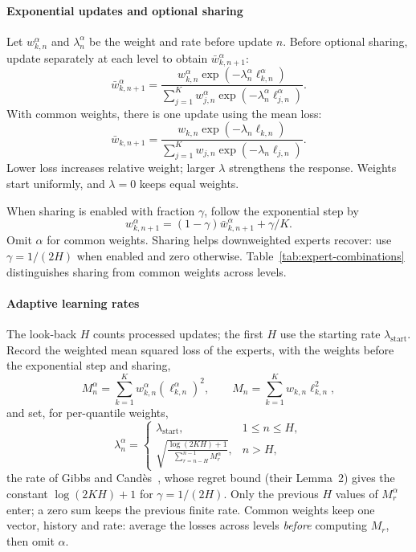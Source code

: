 \documentclass[11pt,a4paper]{article}
\theoremstyle{definition}
\theoremstyle{remark}
\begin{document}
\paragraph{Exponential updates and optional sharing}
Let $w_{k,n}^\alpha$ and $\lambda_n^\alpha$ be the weight and rate
before update $n$. Before optional sharing, update separately at each
level to obtain $\bar w_{k,n+1}^\alpha$:
\begin{equation}
 \bar w_{k,n+1}^\alpha
 =\frac{w_{k,n}^\alpha\exp(-\lambda_n^\alpha\ell_{k,n}^\alpha)}
        {\sum_{j=1}^K w_{j,n}^\alpha
         \exp(-\lambda_n^\alpha\ell_{j,n}^\alpha)}.
 \label{eq:level-expert-weight-step}
\end{equation}
With common weights, there is one update using the mean loss:
\begin{equation}
 \bar w_{k,n+1}
 =\frac{w_{k,n}\exp(-\lambda_n\ell_{k,n})}
        {\sum_{j=1}^K w_{j,n}\exp(-\lambda_n\ell_{j,n})}.
 \label{eq:normalized-expert-weight-step}
\end{equation}
Lower loss increases relative weight; larger $\lambda$ strengthens the
response. Weights start uniformly, and $\lambda=0$ keeps equal weights.

When sharing is enabled with fraction $\gamma$, follow the exponential
step by
\begin{equation}
 w_{k,n+1}^\alpha
 =(1-\gamma)\bar w_{k,n+1}^\alpha+\gamma/K.
 \label{eq:expert-fixed-share}
\end{equation}
Omit $\alpha$ for common weights. Sharing helps downweighted experts
recover: use $\gamma=1/(2H)$ when enabled and zero otherwise.
Table~\ref{tab:expert-combinations} distinguishes sharing from common
weights across levels.

\paragraph{Adaptive learning rates}
\label{sec:adaptive-expert-weighting}
The look-back $H$ counts processed updates; the first $H$ use the starting
rate $\lambda_{\mathrm{start}}$. Record the weighted mean squared loss of the
experts, with the weights before the exponential step and sharing,
\begin{equation}
 M_n^\alpha=\sum_{k=1}^K w_{k,n}^\alpha(\ell_{k,n}^\alpha)^2,\qquad
 M_n=\sum_{k=1}^K w_{k,n}\ell_{k,n}^2,
 \label{eq:expert-loss-moments}
\end{equation}
and set, for per-quantile weights,
\begin{equation}
 \lambda_n^\alpha=
 \begin{cases}
  \lambda_{\mathrm{start}},&1\le n\le H,\\[3pt]
  \displaystyle\sqrt{\frac{\log(2KH)+1}
                    {\sum_{r=n-H}^{n-1}M_r^\alpha}},&n>H,
 \end{cases}
 \label{eq:adaptive-expert-rate}
\end{equation}
the rate of Gibbs and Cand\`es~\cite{dtaci}, whose regret bound (their
Lemma~2) gives the constant $\log(2KH)+1$ for $\gamma=1/(2H)$. Only the
previous $H$ values of $M_r^\alpha$ enter; a zero sum keeps the previous
finite rate. Common weights keep one vector, history and rate: average the
losses across levels \emph{before} computing $M_r$, then omit $\alpha$.
\end{document}
